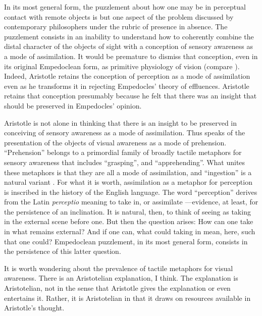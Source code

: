 In its most general form, the puzzlement about how one may be in perceptual contact with remote objects is but one aspect of the problem discussed by contemporary philosophers under the rubric of presence in absence. The puzzlement consists in an inability to understand how to coherently combine the distal character of the objects of sight with a conception of sensory awareness as a mode of assimilation. It would be premature to dismiss that conception, even in its original Empedoclean form, as primitive physiology of vision (compare \citealt[318 n106]{Cherniss:1935fk}). Indeed, Aristotle retains the conception of perception as a mode of assimilation even as he transforms it in rejecting Empedocles' theory of effluences. Aristotle retains that conception presumably because he felt that there was an insight that should be preserved in Empedocles' opinion. 

Aristotle is not alone in thinking that there is an insight to be preserved in conceiving of sensory awareness as a mode of assimilation. Thus \citet{Broad:1952kx} speaks of the presentation of the objects of visual awareness as a mode of prehension.  ``Prehension'' belongs to a primordial family of broadly tactile metaphors for sensory awareness that includes ``grasping'', and ``apprehending''. What unites these metaphors is that they are all a mode of assimilation, and ``ingestion'' is a natural variant \citep[see][7]{Johnston:2006uq,Price:1932fk}. For what it is worth, assimilation as a metaphor for perception is inscribed in the history of the English language. The word ``perception'' derives from the Latin \emph{perceptio} meaning to take in, or assimilate \citep[102]{Burnyeat:1979mv}---evidence, at least, for the persistence of an inclination. It is natural, then, to think of seeing as taking in the external scene before one. But then the question arises: How can one take in what remains external? And if one can, what could taking in mean, here, such that one could? Empedoclean puzzlement, in its most general form, consists in the persistence of this latter question.

It is worth wondering about the prevalence of tactile metaphors for visual awareness. There is an Aristotelian explanation, I think. The explanation is Aristotelian, not in the sense that Aristotle gives the explanation or even entertains it. Rather, it is Aristotelian in that it draws on resources available in Aristotle's thought.

